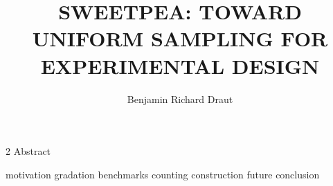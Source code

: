 \documentclass[11pt,Chicago]{uuthesis2e}
\author                 {Benjamin Richard Draut}
\title                  {SWEETPEA: TOWARD UNIFORM SAMPLING FOR EXPERIMENTAL DESIGN}
\begin{document}
\frontmatterformat
\titlepage
\copyrightpage
\dissertationapproval
\setcounter {page}     {2}             %
 {Abstract}
\dedicationpage
\tableofcontents
\listoffigures
\listoftables
%





\maintext       %

\pagestyle{headings} %

 {motivation}
 {gradation}
 {benchmarks}
 {counting}
 {construction}
 {future}
 {conclusion}


\end{document}
